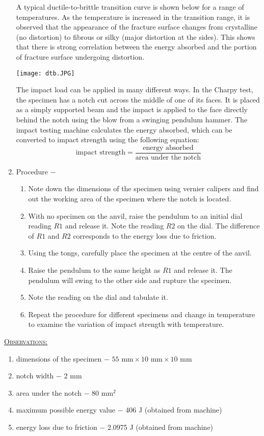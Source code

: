 \documentclass[a4paper, 11pt]{article}
\begin{document}
\begin{enumerate}[label=(\alph*)]
A typical ductile-to-brittle transition curve is shown below for a range of temperatures. As the temperature is increased in the transition range, it is observed that the appearance of the fracture surface changes from crystalline (no distortion) to fibrous or silky (major distortion at the sides). This shows that there is strong correlation between the energy absorbed and the portion of fracture surface undergoing distortion.
\begin{center}
\texttt{[image: dtb.JPG]}
\end{center}
The impact load can be applied in many different ways. In the Charpy test, the specimen has a notch cut across the middle of one of its faces. It is placed as a simply supported beam and the impact is applied to the face directly behind the notch using the blow from a swinging pendulum hammer. The impact testing machine calculates the energy absorbed, which can be converted to impact strength using the following equation:
$$\text{impact strength}=\frac{\text{energy absorbed}}{\text{area under the notch}}$$
	\item {Procedure} $-$ 
	\begin{enumerate}[label=\roman*)]
		\item Note down the dimensions of the specimen using vernier calipers and find out the working area of the specimen where the notch is located.
		\item With no specimen on the anvil, raise the pendulum to an initial dial reading $R1$ and release it. Note the reading $R2$ on the dial. The difference of $R1$ and $R2$ corresponds to the energy loss due to friction.
		\item Using the tongs, carefully place the specimen at the centre of the anvil.
		\item Raise the pendulum to the same height as $R1$ and release it. The pendulum will swing to the other side and rupture the specimen.
		\item Note the reading on the dial and tabulate it.
		\item Repeat the procedure for different specimens and change in temperature to examine the variation of impact strength with temperature.
	\end{enumerate}
\end{enumerate}

\underline{\textsc{Observations:}}
\vspace{-2mm}

\begin{enumerate}[label=(\alph*)]
\itemsep-0.1em
	\item dimensions of the specimen $-$ $55\text{ mm}\times 10 \text{ mm}\times 10 \text{ mm}$
	\item notch width $-$ 2 mm
	\item area under the notch $-$ 80 $\text{mm}^2$
	\item maximum possible energy value $-$ 406 J (obtained from machine)
	\item energy loss due to friction $-$ 2.0975 J (obtained from machine)
\end{enumerate}
\end{document}
